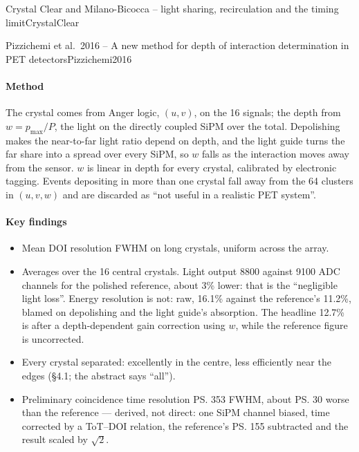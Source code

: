 \begin{programnote}{Crystal Clear and Milano-Bicocca -- light sharing, recirculation and the timing limit}{CrystalClear}
\begin{papernote}{Pizzichemi et al.\ 2016 -- A new method for depth of interaction determination in PET detectors}{Pizzichemi2016}
\paragraph{Method}
The crystal comes from Anger logic, $(u, v)$, on the 16 signals; the depth from
$w = p_{\max}/P$, the light on the directly coupled SiPM over the total.
Depolishing makes the near-to-far light ratio depend on depth, and the light
guide turns the far share into a spread over every SiPM, so $w$ falls as the
interaction moves away from the sensor. $w$ is linear in depth for every
crystal, calibrated by electronic tagging. Events depositing in more than one
crystal fall away from the 64 clusters in $(u, v, w)$ and are discarded as
``not useful in a realistic PET system''.

\paragraph{Key findings}
\begin{itemize}
	\item Mean DOI resolution  FWHM on  long crystals,
		uniform across the array.
	\item Averages over the 16 central crystals. Light output 8800 against 9100
		ADC channels for the polished
		reference, about 3\% lower: that is the ``negligible light loss''.
		Energy resolution is not: raw, 16.1\% against the reference's
		11.2\%, blamed on depolishing and the light guide's absorption. The
		headline 12.7\% is after a depth-dependent gain correction using $w$,
		while the reference figure is uncorrected.
	\item Every crystal separated: excellently in the centre, less
		efficiently near the edges (\S4.1; the abstract says ``all'').
	\item Preliminary coincidence time resolution \ps{353 } FWHM, about
		\ps{30} worse than the reference --- derived, not direct: one SiPM
		channel biased, time corrected by a ToT--DOI relation, the reference's
		\ps{155} subtracted and the result scaled by $\sqrt{2}$.
\end{itemize}


\end{papernote}
\end{programnote}
